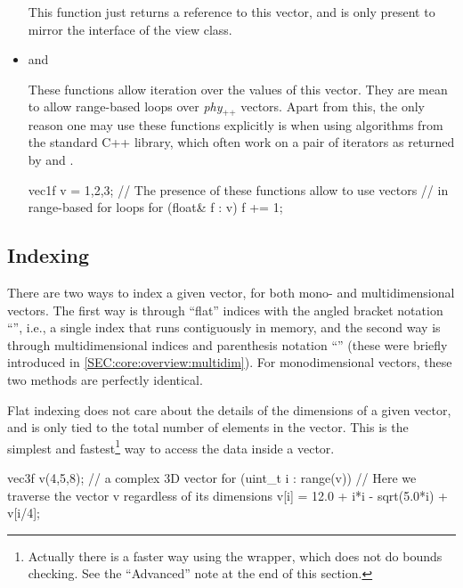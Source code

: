 \documentclass[12pt,a4paper]{report}
\newcommand{\phypp}{\textit{phy}$_{\text{++}}$\xspace}
\newenvironment{example}
{
    \begin{mdframed}[style=example,frametitle={Example}]
}
{
    \end{mdframed}
}
\begin{document}
\begin{itemize}
This function just returns a reference to this vector, and is only present to mirror the interface of the view class.

\item {} and 

These functions allow iteration over the values of this vector. They are mean to allow range-based  loops over \phypp vectors. Apart from this, the only reason one may use these functions explicitly is when using algorithms from the standard C++ library, which often work on a pair of iterators as returned by  and .

\begin{example}
\begin{cppcode}
vec1f v = {1,2,3};
// The presence of these functions allow to use vectors
// in range-based for loops
for (float& f : v) {
    f += 1;
}
\end{cppcode}
\end{example}
\end{itemize}

\subsection{Indexing \label{SEC:core:vec:indexing}}

There are two ways to index a given vector, for both mono- and multidimensional vectors. The first way is through ``flat'' indices with the angled bracket notation ``'', i.e., a single index that runs contiguously in memory, and the second way is through multidimensional indices and parenthesis notation ``'' (these were briefly introduced in \ref{SEC:core:overview:multidim}). For monodimensional vectors, these two methods are perfectly identical.

Flat indexing does not care about the details of the dimensions of a given vector, and is only tied to the total number of elements in the vector. This is the simplest and fastest\footnote{Actually there is a faster way using the  wrapper, which does not do bounds checking. See the ``Advanced'' note at the end of this section.} way to access the data inside a vector.

\begin{example}
\begin{cppcode}
vec3f v(4,5,8); // a complex 3D vector
for (uint_t i : range(v)) {
    // Here we traverse the vector v regardless of its dimensions
    v[i] = 12.0 + i*i - sqrt(5.0*i) + v[i/4];
}
\end{cppcode}
\end{example}
\end{document}
